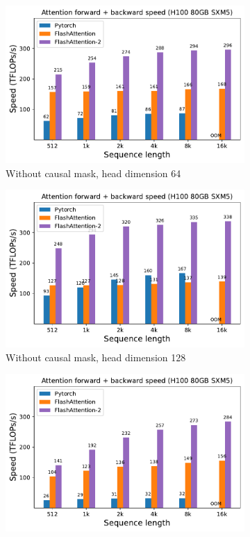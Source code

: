 \begin{figure}[ht]
  \centering
  \begin{subfigure}{.5\textwidth}
    \centering
    \includegraphics[width=.95\linewidth]{figs/flash2_h100_causal_False_hdim_64_fwd_bwd_speed.pdf}
    \caption{Without causal mask, head dimension 64}
  \end{subfigure}%
  \begin{subfigure}{.5\textwidth}
    \centering
    \includegraphics[width=.95\linewidth]{figs/flash2_h100_causal_False_hdim_128_fwd_bwd_speed.pdf}
    \caption{Without causal mask, head dimension 128}
  \end{subfigure}
  \begin{subfigure}{.5\textwidth}
    \centering
    \includegraphics[width=.95\linewidth]{figs/flash2_h100_causal_True_hdim_64_fwd_bwd_speed.pdf}

\end{subfigure}
\end{figure}
